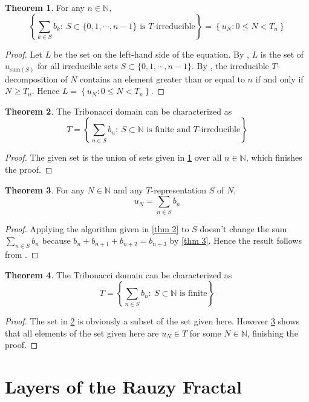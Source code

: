 \documentclass{article}
\theoremstyle{definition}
\newtheorem{theorem}{Theorem}
\begin{document}
\begin{theorem}
\label{thm 5-1}
For any $n\in\mathbb{N}$,
\[
\left\{ \sum_{k\in S}b_k:\ S\subset \{0,1,\cdots,n-1\}  \text{ is $T$-irreducible} \right\} = \left\{ u_N: 0\leq N<T_n \right\}
\]
\end{theorem}
\begin{proof}
Let $L$ be the set on the left-hand side of the equation. By , $L$ is the set of $u_{\text{sum}(S)}$ for all irreducible sets $S\subset\{0,1,\cdots,n-1\}$. By , the irreducible $T$-decomposition of $N$ contains an element greater than or equal to $n$ if and only if $N\geq T_n$. Hence $L=\left\{ u_N: 0\leq N<T_n \right\}$.
\end{proof}

\begin{theorem}
\label{thm 5} The Tribonacci domain can be characterized as
\[ 
T = \left\{ \sum_{n\in S}b_n:\ S\subset \mathbb{N}  \text{ is finite and $T$-irreducible} \right\}
\]
\end{theorem}
\begin{proof}
The given set is the union of sets given in \cref{thm 5-1} over all $n\in \mathbb{N}$, which finishes the proof.
\end{proof}

\begin{theorem}
\label{thm 6}
For any $N\in\mathbb{N}$ and any $T$-representation $S$ of $N$, \[ u_N=\sum_{n\in S} b_n\]
\end{theorem}
\begin{proof}
Applying the algorithm given in \cref{thm 2} to $S$ doesn't change the sum $\sum_{n\in S}b_n$ because $b_n+b_{n+1}+b_{n+2}=b_{n+3}$ by \cref{thm 3}. Hence the result follows from . 
\end{proof}

\begin{theorem}
\label{thm 7}
The Tribonacci domain can be characterized as
\[ T = \left\{ \sum_{n\in S}b_n:\ S\subset \mathbb{N}  \text{ is finite}\right\}\]
\end{theorem}
\begin{proof}
The set in \cref{thm 5} is obviously a subset of the set given here. However \cref{thm 6} shows that all elements of the set given here are $u_N\in T$ for some $N\in \mathbb{N}$, finishing the proof.
\end{proof}


\section{Layers of the Rauzy Fractal}
\label{sec3}
\end{document}
